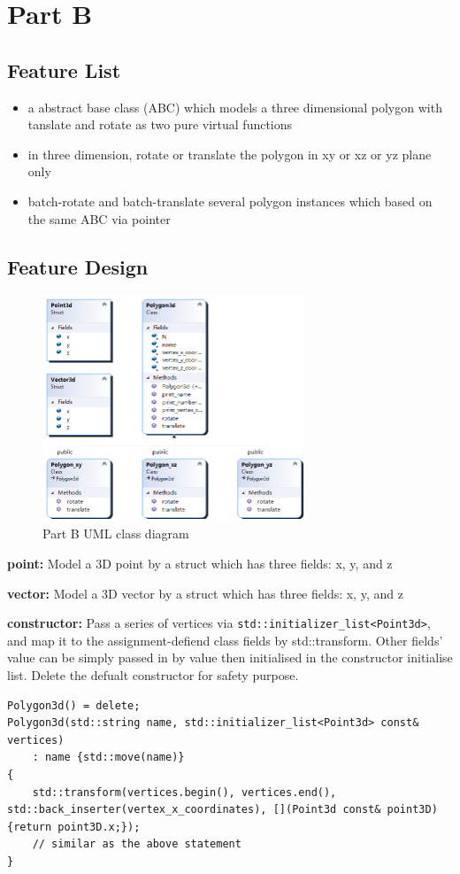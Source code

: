 \documentclass[12pt, a4paper]{article}
\begin{document}
\section{Part B}
\subsection{Feature List}
\begin{itemize}
  \item a abstract base class (ABC) which models a three dimensional polygon with tanslate and rotate as two pure virtual functions
  \item in three dimension, rotate or translate the polygon in xy or xz or yz plane only
  \item batch-rotate and batch-translate several polygon instances which based on the same ABC via pointer
\end{itemize}

\subsection{Feature Design}
\begin{figure}[htbp]
  \begin{centering}
    \includegraphics[width=0.7\textwidth]{B_UML}
    \caption{Part B UML class diagram}
  \end{centering}
  \label{fig:B_UML}
\end{figure}

\textbf{point:} Model a 3D point by a struct which has three fields: x, y, and z

\textbf{vector:} Model a 3D vector by a struct which has three fields: x, y, and z

\textbf{constructor:} Pass a series of vertices via \lstinline{std::initializer_list<Point3d>}, and map it to the assignment-defiend class fields by std::transform. Other fields' value can be simply passed in by value then initialised in the constructor initialise list. Delete the defualt constructor for safety purpose.
\begin{lstlisting}[frame=single, breaklines]
Polygon3d() = delete;
Polygon3d(std::string name, std::initializer_list<Point3d> const& vertices)
    : name {std::move(name)}
{
    std::transform(vertices.begin(), vertices.end(), std::back_inserter(vertex_x_coordinates), [](Point3d const& point3D){return point3D.x;});
    // similar as the above statement
}
\end{lstlisting}
\end{document}
